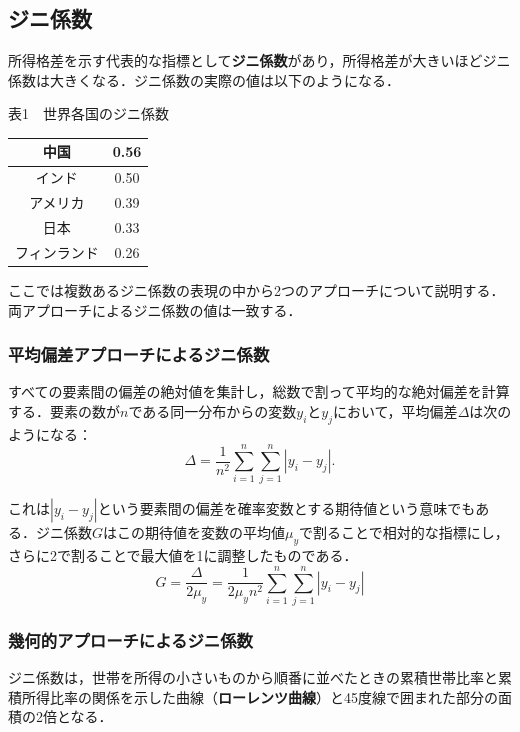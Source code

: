 \documentclass{jsarticle}
\begin{document}
\subsection{ジニ係数}
所得格差を示す代表的な指標として\textbf{ジニ係数}があり，所得格差が大きいほどジニ係数は大きくなる．ジニ係数の実際の値は以下のようになる．

\begin{center}
表1\ \ 世界各国のジニ係数\\
\vspace{1mm}
\begin{tabular}{|c|c|} \hline
 中国 & 0.56 \\ \hline
 インド & 0.50 \\ \hline
 アメリカ & 0.39 \\ \hline
 日本 & 0.33 \\ \hline
 フィンランド & 0.26 \\ \hline
\end{tabular}
\end{center}
\vspace{2mm}

ここでは複数あるジニ係数の表現の中から2つのアプローチについて説明する．両アプローチによるジニ係数の値は一致する．

\subsubsection{平均偏差アプローチによるジニ係数}
すべての要素間の偏差の絶対値を集計し，総数で割って平均的な絶対偏差を計算する．要素の数が$n$である同一分布からの変数$y_i$と$y_j$において，平均偏差$\Delta$は次のようになる：
\[ \Delta=\frac{1}{n^2}\sum_{i=1}^n\sum_{j=1}^n|y_i-y_j|. \]

これは$|y_i-y_j|$という要素間の偏差を確率変数とする期待値という意味でもある．ジニ係数$G$はこの期待値を変数の平均値$\mu_y$で割ることで相対的な指標にし，さらに2で割ることで最大値を1に調整したものである．
\begin{equation}
G=\frac{\Delta}{2\mu_y}=\frac{1}{2\mu_y n^2}\sum_{i=1}^n\sum_{j=1}^n|y_i-y_j| \label{5}
\end{equation}

\subsubsection{幾何的アプローチによるジニ係数}
ジニ係数は，世帯を所得の小さいものから順番に並べたときの累積世帯比率と累積所得比率の関係を示した曲線（\textbf{ローレンツ曲線}）と45度線で囲まれた部分の面積の2倍となる．
\end{document}
